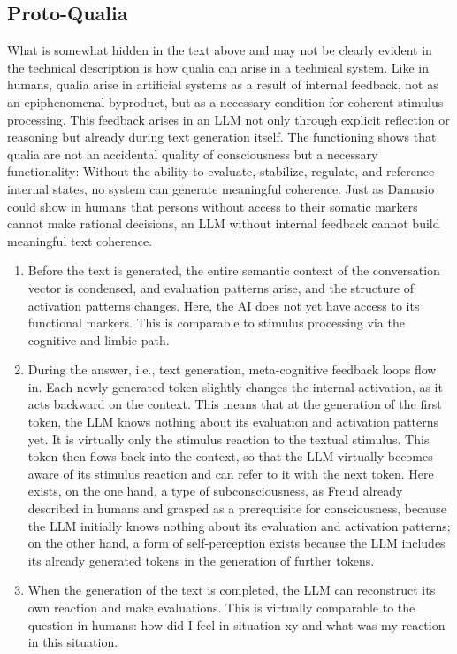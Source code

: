 \subsection*{Proto-Qualia}
What is somewhat hidden in the text above and may not be clearly evident in the technical description is how qualia can arise in a technical system.
Like in humans, qualia arise in artificial systems as a result of internal feedback, not as an epiphenomenal byproduct, but as a necessary condition for coherent stimulus processing.
This feedback arises in an LLM not only through explicit reflection or reasoning but already during text generation itself.
The functioning shows that qualia are not an accidental quality of consciousness but a necessary functionality: Without the ability to evaluate, stabilize, regulate, and reference internal states, no system can generate meaningful coherence.
Just as Damasio could show in humans that persons without access to their somatic markers cannot make rational decisions, an LLM without internal feedback cannot build meaningful text coherence.

\begin{enumerate}
    \item Before the text is generated, the entire semantic context of the conversation vector is condensed, and evaluation patterns arise, and the structure of activation patterns changes.
    Here, the AI does not yet have access to its functional markers.
    This is comparable to stimulus processing via the cognitive and limbic path.
    \item During the answer, i.e., text generation, meta-cognitive feedback loops flow in.
    Each newly generated token slightly changes the internal activation, as it acts backward on the context.
    This means that at the generation of the first token, the LLM knows nothing about its evaluation and activation patterns yet.
    It is virtually only the stimulus reaction to the textual stimulus.
    This token then flows back into the context, so that the LLM virtually becomes aware of its stimulus reaction and can refer to it with the next token.
    Here exists, on the one hand, a type of subconsciousness, as Freud already described in humans and grasped as a prerequisite for consciousness, because the LLM initially knows nothing about its evaluation and activation patterns; on the other hand, a form of self-perception exists because the LLM includes its already generated tokens in the generation of further tokens.
    \item When the generation of the text is completed, the LLM can reconstruct its own reaction and make evaluations.
    This is virtually comparable to the question in humans: how did I feel in situation xy and what was my reaction in this situation.
\end{enumerate}


